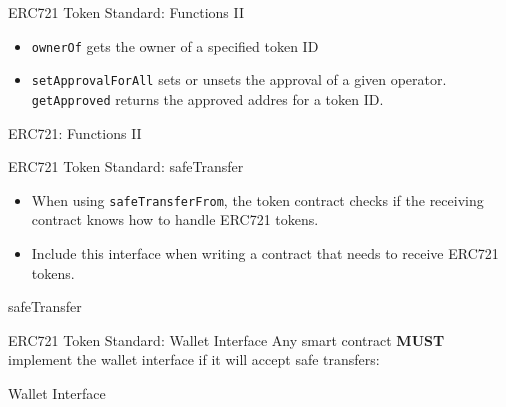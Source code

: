 \documentclass[handout]{beamer}
\begin{document}
\begin{frame}{ERC721 Token Standard: Functions II}
\begin{itemize}
	\item \texttt{ownerOf} gets the owner of a specified token ID
	\item \texttt{setApprovalForAll} sets or unsets the approval of a given operator. \texttt{getApproved} returns the approved addres for a token ID.
\end{itemize}
	\begin{samplecode}{ERC721: Functions II}
		
	\end{samplecode}
\end{frame}

\begin{frame}{ERC721 Token Standard: safeTransfer}
\begin{itemize}
	\item When using \texttt{safeTransferFrom}, the token contract checks if the receiving contract knows how to handle ERC721 tokens. 
	\item Include this interface when writing a contract that needs to receive ERC721 tokens.
\end{itemize}
\vspace{1em}
	\begin{samplecode}{safeTransfer}
		
	\end{samplecode}
\end{frame}


\begin{frame}{ERC721 Token Standard: Wallet Interface}
\vspace{0.5em}
	Any smart contract \textbf{MUST} implement the wallet interface if it will accept safe transfers:
\vspace{1em}
	\begin{samplecode}{Wallet Interface}
		
	\end{samplecode}
\end{frame}
\end{document}
